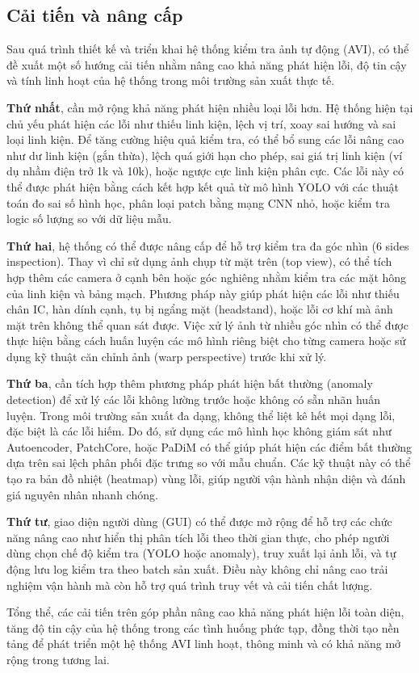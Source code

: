 \subsection{Cải tiến và nâng cấp}

Sau quá trình thiết kế và triển khai hệ thống kiểm tra ảnh tự động (AVI), có thể đề xuất một số hướng cải tiến nhằm nâng cao khả năng phát hiện lỗi, độ tin cậy và tính linh hoạt của hệ thống trong môi trường sản xuất thực tế.

\textbf{Thứ nhất}, cần mở rộng khả năng phát hiện nhiều loại lỗi hơn. Hệ thống hiện tại chủ yếu phát hiện các lỗi như thiếu linh kiện, lệch vị trí, xoay sai hướng và sai loại linh kiện. Để tăng cường hiệu quả kiểm tra, có thể bổ sung các lỗi nâng cao như dư linh kiện (gắn thừa), lệch quá giới hạn cho phép, sai giá trị linh kiện (ví dụ nhầm điện trở 1k và 10k), hoặc ngược cực linh kiện phân cực. Các lỗi này có thể được phát hiện bằng cách kết hợp kết quả từ mô hình YOLO với các thuật toán đo sai số hình học, phân loại patch bằng mạng CNN nhỏ, hoặc kiểm tra logic số lượng so với dữ liệu mẫu.

\textbf{Thứ hai}, hệ thống có thể được nâng cấp để hỗ trợ kiểm tra đa góc nhìn (6 sides inspection). Thay vì chỉ sử dụng ảnh chụp từ mặt trên (top view), có thể tích hợp thêm các camera ở cạnh bên hoặc góc nghiêng nhằm kiểm tra các mặt hông của linh kiện và bảng mạch. Phương pháp này giúp phát hiện các lỗi như thiếu chân IC, hàn dính cạnh, tụ bị ngẩng mặt (headstand), hoặc lỗi cơ khí mà ảnh mặt trên không thể quan sát được. Việc xử lý ảnh từ nhiều góc nhìn có thể được thực hiện bằng cách huấn luyện các mô hình riêng biệt cho từng camera hoặc sử dụng kỹ thuật căn chỉnh ảnh (warp perspective) trước khi xử lý.

\textbf{Thứ ba}, cần tích hợp thêm phương pháp phát hiện bất thường (anomaly detection) để xử lý các lỗi không lường trước hoặc không có sẵn nhãn huấn luyện. Trong môi trường sản xuất đa dạng, không thể liệt kê hết mọi dạng lỗi, đặc biệt là các lỗi hiếm. Do đó, sử dụng các mô hình học không giám sát như Autoencoder, PatchCore, hoặc PaDiM có thể giúp phát hiện các điểm bất thường dựa trên sai lệch phân phối đặc trưng so với mẫu chuẩn. Các kỹ thuật này có thể tạo ra bản đồ nhiệt (heatmap) vùng lỗi, giúp người vận hành nhận diện và đánh giá nguyên nhân nhanh chóng.

\textbf{Thứ tư}, giao diện người dùng (GUI) có thể được mở rộng để hỗ trợ các chức năng nâng cao như hiển thị phân tích lỗi theo thời gian thực, cho phép người dùng chọn chế độ kiểm tra (YOLO hoặc anomaly), truy xuất lại ảnh lỗi, và tự động lưu log kiểm tra theo batch sản xuất. Điều này không chỉ nâng cao trải nghiệm vận hành mà còn hỗ trợ quá trình truy vết và cải tiến chất lượng.

Tổng thể, các cải tiến trên góp phần nâng cao khả năng phát hiện lỗi toàn diện, tăng độ tin cậy của hệ thống trong các tình huống phức tạp, đồng thời tạo nền tảng để phát triển một hệ thống AVI linh hoạt, thông minh và có khả năng mở rộng trong tương lai.
